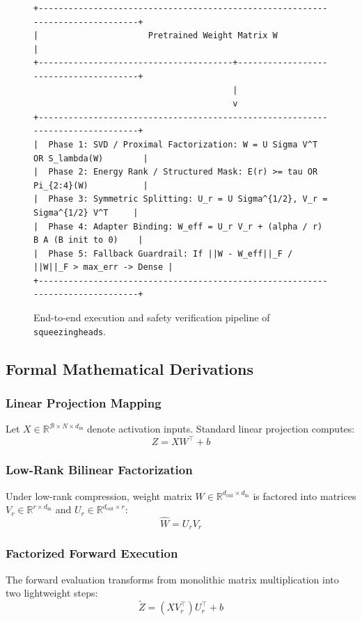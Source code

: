 \begin{figure}[t]
\centering
\begin{verbatim}
+-------------------------------------------------------------------------------+
|                      Pretrained Weight Matrix W                               |
+---------------------------------------+---------------------------------------+
                                        |
                                        v
+-------------------------------------------------------------------------------+
|  Phase 1: SVD / Proximal Factorization: W = U Sigma V^T OR S_lambda(W)        |
|  Phase 2: Energy Rank / Structured Mask: E(r) >= tau OR Pi_{2:4}(W)           |
|  Phase 3: Symmetric Splitting: U_r = U Sigma^{1/2}, V_r = Sigma^{1/2} V^T     |
|  Phase 4: Adapter Binding: W_eff = U_r V_r + (alpha / r) B A (B init to 0)    |
|  Phase 5: Fallback Guardrail: If ||W - W_eff||_F / ||W||_F > max_err -> Dense |
+-------------------------------------------------------------------------------+
\end{verbatim}
\caption{End-to-end execution and safety verification pipeline of \texttt{squeezingheads}.}
\end{figure}

\subsection{Formal Mathematical Derivations}

\subsubsection{Linear Projection Mapping}
Let $X \in \mathbb{R}^{\mathcal{B} \times N \times d_{\text{in}}}$ denote activation inputs. Standard linear projection computes:
\[
Z = X W^\top + b
\]

\subsubsection{Low-Rank Bilinear Factorization}
Under low-rank compression, weight matrix $W \in \mathbb{R}^{d_{\text{out}} \times d_{\text{in}}}$ is factored into matrices $V_r \in \mathbb{R}^{r \times d_{\text{in}}}$ and $U_r \in \mathbb{R}^{d_{\text{out}} \times r}$:
\[
\hat{W} = U_r V_r
\]

\subsubsection{Factorized Forward Execution}
The forward evaluation transforms from monolithic matrix multiplication into two lightweight steps:
\[
\tilde{Z} = (X V_r^\top) U_r^\top + b
\]

